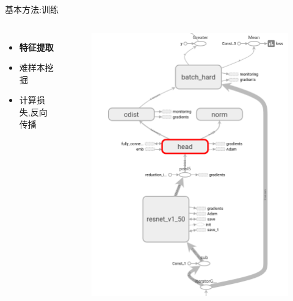 \documentclass[notes]{beamer}
\begin{document}
\begin{frame}
	{基本方法:训练} 
	\begin{columns}
	\begin{itemize}
		\item \textbf{特征提取}
		\item 难样本挖掘
		\item 计算损失,反向传播
	\end{itemize}
	\begin{figure}
		\centering
		\includegraphics[width=\textwidth]{2018-03-15-21-40-06.png}			
	\end{figure}	
	\end{columns} 
	
	
\end{frame}
\end{document}
